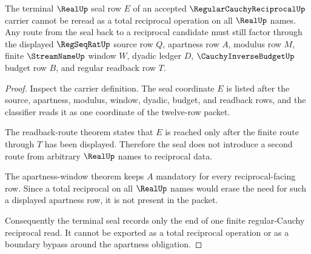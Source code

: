\begin{theorem}
\label{thm:regular-cauchy-reciprocal-terminal-seal-non-totality}
The terminal $\RealUp$ seal row $E$ of an accepted $\RegularCauchyReciprocalUp$ carrier cannot be reread as a total reciprocal operation on all $\RealUp$ names. Any route from the seal back to a reciprocal candidate must still factor through the displayed $\RegSeqRatUp$ source row $Q$, apartness row $A$, modulus row $M$, finite $\StreamNameUp$ window $W$, dyadic ledger $D$, $\CauchyInverseBudgetUp$ budget row $B$, and regular readback row $T$.
\end{theorem}
\begin{proof}
Inspect the carrier definition. The seal coordinate $E$ is listed after the source, apartness, modulus, window, dyadic, budget, and readback rows, and the classifier reads it as one coordinate of the twelve-row packet.

The readback-route theorem states that $E$ is reached only after the finite route through $T$ has been displayed. Therefore the seal does not introduce a second route from arbitrary $\RealUp$ names to reciprocal data.

The apartness-window theorem keeps $A$ mandatory for every reciprocal-facing row. Since a total reciprocal on all $\RealUp$ names would erase the need for such a displayed apartness row, it is not present in the packet.

Consequently the terminal seal records only the end of one finite regular-Cauchy reciprocal read. It cannot be exported as a total reciprocal operation or as a boundary bypass around the apartness obligation.
\end{proof}

